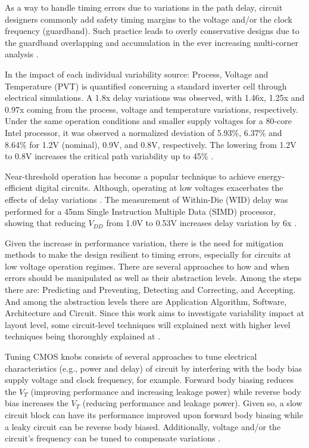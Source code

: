 \documentclass[pgmicro,diss,english]{iiufrgs}
\begin{document}
As a way to handle timing errors due to variations in the path delay, circuit designers commonly add safety timing margins to the voltage and/or the clock frequency (guardband). Such practice leads to overly conservative designs due to the guardband overlapping and accumulation in the ever increasing multi-corner analysis \cite{austin2005opportunities}.

In \cite{jeong2009impact} the impact of each individual variability source: Process, Voltage and Temperature (PVT) is quantified concerning a standard inverter cell through electrical simulations. A 1.8x delay variations was observed, with 1.46x, 1.25x and 0.97x coming from the process, voltage and temperature variations, respectively. Under the same operation conditions and smaller supply voltages for a 80-core Intel processor, it was observed a normalized deviation of 5.93\%, 6.37\% and 8.64\% for 1.2V (nominal), 0.9V, and 0.8V, respectively. The lowering from 1.2V to 0.8V increases the critical path variability up to 45\% \cite{dighe2011within}.

Near-threshold operation has become a popular technique to achieve energy-efficient digital circuits. Although, operating at low voltages exacerbates the effects of delay variations \cite{jeon2012design, dreslinski2010near, rithe2011effect, kakoee2012variation, pawlowski2012530mv}.
The measurement of Within-Die (WID) delay was performed for a 45nm Single Instruction Multiple Data (SIMD) processor, showing that reducing $V_{DD}$ from 1.0V to 0.53V increases delay variation by 6x \cite{pawlowski2012530mv}.

Given the increase in performance variation, there is the need for mitigation methods to make the design resilient to timing errors, especially for circuits at low voltage operation regimes. There are several approaches to how and when errors should be manipulated as well as their abstraction levels. Among the steps there are: Predicting and Preventing, Detecting and Correcting, and Accepting. And among the abstraction levels there are Application Algorithm, Software, Architecture and Circuit. Since this work aims to investigate variability impact at layout level, some circuit-level techniques will explained next with higher level techniques being thoroughly explained at \cite{rahimi2016variability}.

Tuning CMOS knobs consists of several approaches to tune electrical characteristics (e.g., power and delay) of circuit by interfering with the body bias supply voltage and clock frequency, for example. Forward body biasing reduces the $V_T$ (improving performance and increasing leakage power) while reverse body bias increases the $V_T$ (reducing performance and leakage power). Given so, a slow circuit block can have its performance improved upon forward body biasing while a leaky circuit can be reverse body biased. Additionally, voltage and/or the circuit's frequency can be tuned to compensate variations \cite{dighe2011within, tschanz2002adaptive, borkar2004design}.
\end{document}
